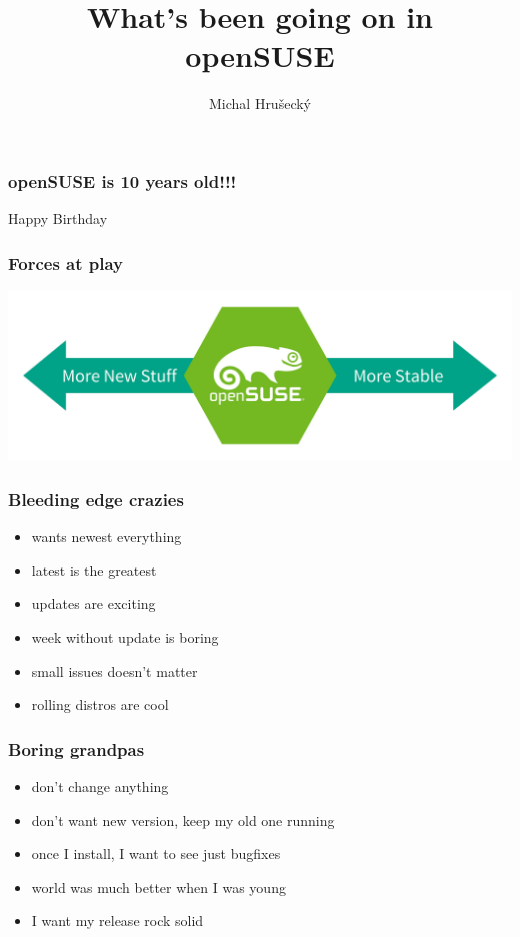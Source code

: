 \documentclass{beamer}
\author{Michal Hru\v{s}eck\'{y}\newline {\small openSUSE Board}}
\title{What's been going on in openSUSE}
\begin{document}
\begin{frame}[t,plain]
\titlepage
\end{frame}



\begin{frame}[t]
\frametitle{openSUSE is 10 years old!!!}
Happy Birthday
\end{frame}


\begin{frame}[t]
\frametitle{Forces at play}
\begin{center}
\vspace{1cm}
\includegraphics[width=.8\paperwidth]{forces}
\end{center}
\end{frame}

\begin{frame}[t]
\frametitle{Bleeding edge crazies}
\begin{itemize}
\item wants newest everything
\item latest is the greatest
\item updates are exciting
\item week without update is boring
\item small issues doesn't matter
\item rolling distros are cool
\end{itemize}
\end{frame}

\begin{frame}[t]
\frametitle{Boring grandpas}
\begin{itemize}
\item don't change anything
\item don't want new version, keep my old one running
\item once I install, I want to see just bugfixes
\item world was much better when I was young
\item I want my release rock solid
\end{itemize}
\end{frame}
\end{document}
